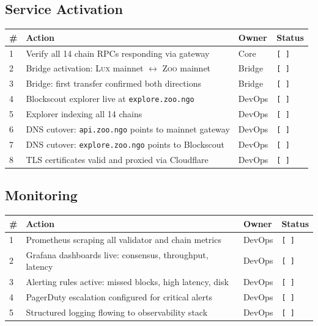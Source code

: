 \documentclass[11pt,letterpaper]{article}
\newcommand{\pending}{\texttt{[ ]}}
\newcommand{\Zoo}{\textsc{Zoo}}
\newcommand{\Lux}{\textsc{Lux}}
\begin{document}
\subsection{Service Activation}

\begin{tabularx}{\textwidth}{@{}l X l l@{}}
\toprule
\textbf{\#} & \textbf{Action} & \textbf{Owner} & \textbf{Status} \\
\midrule
1  & Verify all 14 chain RPCs responding via gateway                & Core   & \pending \\
2  & Bridge activation: \Lux{} mainnet $\leftrightarrow$ \Zoo{} mainnet & Bridge & \pending \\
3  & Bridge: first transfer confirmed both directions               & Bridge & \pending \\
4  & Blockscout explorer live at \texttt{explore.zoo.ngo}           & DevOps & \pending \\
5  & Explorer indexing all 14 chains                                & DevOps & \pending \\
6  & DNS cutover: \texttt{api.zoo.ngo} points to mainnet gateway    & DevOps & \pending \\
7  & DNS cutover: \texttt{explore.zoo.ngo} points to Blockscout     & DevOps & \pending \\
8  & TLS certificates valid and proxied via Cloudflare              & DevOps & \pending \\
\bottomrule
\end{tabularx}

\subsection{Monitoring}

\begin{tabularx}{\textwidth}{@{}l X l l@{}}
\toprule
\textbf{\#} & \textbf{Action} & \textbf{Owner} & \textbf{Status} \\
\midrule
1 & Prometheus scraping all validator and chain metrics         & DevOps & \pending \\
2 & Grafana dashboards live: consensus, throughput, latency     & DevOps & \pending \\
3 & Alerting rules active: missed blocks, high latency, disk    & DevOps & \pending \\
4 & PagerDuty escalation configured for critical alerts         & DevOps & \pending \\
5 & Structured logging flowing to observability stack            & DevOps & \pending \\
\bottomrule
\end{tabularx}
\end{document}

